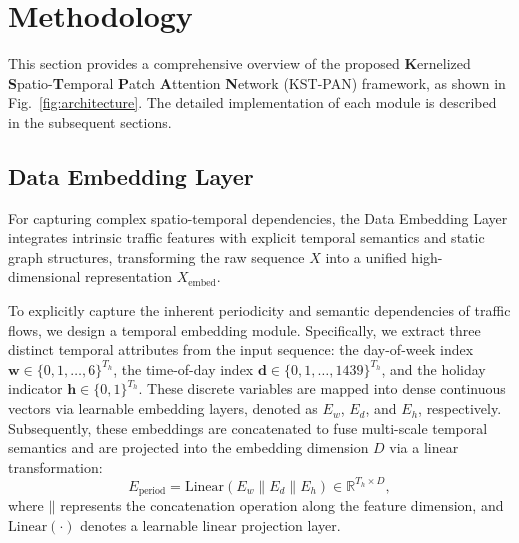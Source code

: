 \documentclass[5p,times,authoryear]{elsarticle}
\begin{document}
\section{Methodology}

This section provides a comprehensive overview of the proposed \textbf{K}ernelized \textbf{S}patio-\textbf{T}emporal \textbf{P}atch \textbf{A}ttention \textbf{N}etwork (KST-PAN) framework, as shown in Fig.~\ref{fig:architecture}. The detailed implementation of each module is described in the subsequent sections. 


\subsection{Data Embedding Layer}
For capturing complex spatio-temporal dependencies, the Data Embedding Layer integrates intrinsic traffic features with explicit temporal semantics and static graph structures, transforming the raw sequence $X$ into a unified high-dimensional representation $X_{\mathrm{embed}}$.

To explicitly capture the inherent periodicity and semantic dependencies of traffic flows, we design a temporal embedding module. 
Specifically, we extract three distinct temporal attributes from the input sequence: the day-of-week index $\mathbf{w} \in \{0, 1, \ldots, 6\}^{T_h}$, the time-of-day index $\mathbf{d} \in \{0, 1, \ldots, 1439\}^{T_h}$, and the holiday indicator $\mathbf{h} \in \{0, 1\}^{T_h}$. 
These discrete variables are mapped into dense continuous vectors via learnable embedding layers, denoted as $E_{w}$, $E_{d}$, and $E_{h}$, respectively. 
Subsequently, these embeddings are concatenated to fuse multi-scale temporal semantics and are projected into the embedding dimension $D$ via a linear transformation:
\vspace{-3pt}
\begin{equation}
    E_{\mathrm{period}} = \mathrm{Linear}(E_{w} \mathbin{\|} E_{d} \mathbin{\|} E_{h}) \in \mathbb{R}^{T_h \times D},
    \label{eq:temporal_proj}
\end{equation}
\vspace{-3pt}
where $\mathbin{\|}$ represents the concatenation operation along the feature dimension, and $\mathrm{Linear}(\cdot)$ denotes a learnable linear projection layer.
\end{document}
